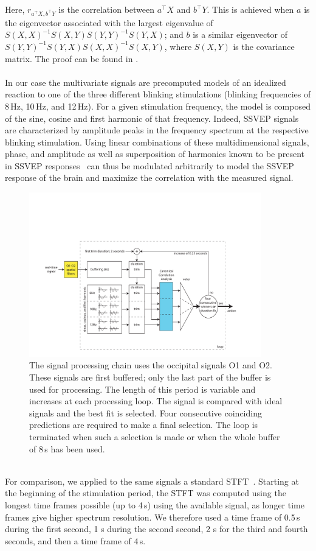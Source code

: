 \documentclass[smallextended]{svjour3}
\begin{document}
Here, $r_{a^\top X, b^\top Y}$ is the correlation between $a^\top X$ and $b^\top Y$. This is achieved when $a$ is the eigenvector associated with the largest eigenvalue of $S(X, X)^{-1} S(X,Y) S(Y, Y)^{-1} S(Y, X)$; and $b$ is a similar eigenvector of $S(Y, Y)^{-1} S(Y, X) S(X, X)^{-1} S(X, Y)$, where $S(X, Y)$ is the covariance matrix. The proof can be found in \cite{rencher2003}.\\
\\
In our case the multivariate signals are precomputed models of an idealized reaction to one of the three different blinking stimulations (blinking frequencies of 8\,Hz, 10\,Hz, and 12\,Hz).
For a given stimulation frequency, the model is composed of the sine, cosine and first harmonic of that frequency.
Indeed, SSVEP signals are characterized by amplitude peaks in the frequency spectrum at the respective blinking stimulation.
Using linear combinations of these multidimensional signals, phase, and amplitude as well as superposition of harmonics known to be present in SSVEP responses~\cite{herrmann2001} can thus be modulated arbitrarily to model the SSVEP response of the brain and maximize the correlation with the measured signal.\\
\begin{figure}
\center
\includegraphics[width=0.9\textwidth]{figures/schema-openvibe-cca.pdf}
\caption{The signal processing chain uses the occipital signals O1 and O2. These signals are first buffered; only the last part of the buffer is used for processing. The length of this period is variable and increases at each processing loop. The signal is compared with ideal signals and the best fit is selected. Four consecutive coinciding predictions are required to make a final selection. The loop is terminated when such a selection is made or when the whole buffer of 8\,s has been used.}
\label{fig:schema-openvibe-cca}
\end{figure}
\\
For comparison, we applied to the same signals a standard STFT~\cite{Durak2003}. 
Starting at the beginning of the stimulation period, the STFT was computed using the longest time frames possible (up to 4\,s) using the available signal, as longer time frames give higher spectrum resolution. %
We therefore used a time frame of 0.5\,s during the first second, 1 s during the second second, 2 s for the third and fourth seconds, and then a time frame of 4\,s.
\end{document}
